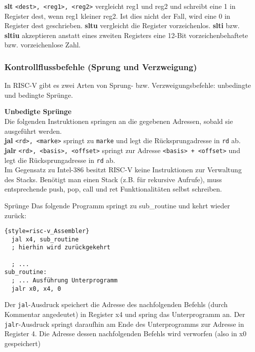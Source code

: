 {\textbf{slt} \texttt{<dest>, <reg1>, <reg2>} vergleicht reg1 und reg2 und schreibt eine 1 in Register dest, wenn reg1 kleiner reg2. Ist dies nicht der Fall, wird eine 0 in Register dest geschrieben. \textbf{sltu} vergleicht die Register vorzeichenlos. \textbf{slti} bzw. \textbf{sltiu} akzeptieren anstatt eines zweiten Registers eine 12-Bit vorzeichenbehaftete bzw. vorzeichenlose Zahl.

\subsubsection{Kontrollflussbefehle (Sprung und Verzweigung)}
\label{manual-riscv-jump-instructions}
In RISC-V gibt es zwei Arten von Sprung- bzw. Verzweigungsbefehle: unbedingte und bedingte Sprünge.

\textbf{Unbedigte Sprünge}\\

Die folgenden Instruktionen springen an die gegebenen Adressen, sobald sie ausgeführt werden.\\
\textbf{jal} \texttt{<rd>, <marke>} springt zu \texttt{marke} und legt die Rücksprungadresse in \texttt{rd} ab.\\
\textbf{jalr} \texttt{<rd>, <basis>, <offset>} springt zur Adresse \texttt{<basis> + <offset>} und legt die Rücksprungadresse in \texttt{rd} ab.\\

Im Gegensatz zu Intel-386 besitzt RISC-V keine Instruktionen zur Verwaltung des Stacks. Benötigt man einen Stack (z.B. für rekursive Aufrufe), muss entsprechende push, pop, call und ret Funktionalitäten selbst schreiben.

\begin{exampleblock}{Sprünge}
Das folgende Programm springt zu sub\_routine und kehrt wieder zurück:
\begin{lstlisting}{style=risc-v_Assembler}
  jal x4, sub_routine
  ; hierhin wird zurückgekehrt
  
  ; ...
sub_routine:
  ; ... Ausführung Unterprogramm
  jalr x0, x4, 0
\end{lstlisting}
Der \texttt{jal}-Ausdruck speichert die Adresse des nachfolgenden Befehls (durch Kommentar angedeutet) in Register x4 und spring das Unterprogramm an. Der \texttt{jalr}-Ausdruck springt daraufhin am Ende des Unterprogramms zur Adresse in Register 4. Die Adresse dessen nachfolgenden Befehls wird verworfen (also in x0 gespeichert)
\end{exampleblock}

}

